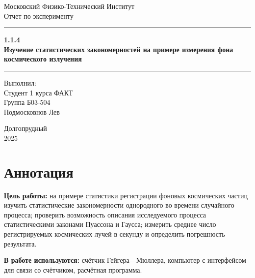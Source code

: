 \documentclass[a4paper, 12pt]{article}
\begin{document}
\begin{titlepage}
    
    \begin{center}
        \vspace*{5cm}
        \Huge Московский Физико-Технический Институт
        \vspace*{2cm}\\
        \LARGE Отчет по эксперименту
        \\\vspace*{0.25cm}
        
        \noindent\rule{\textwidth}{1pt}
        \vspace*{-0.25cm}
        
        \huge \textbf{1.1.4\\ Изучение статистических закономерностей на примере измерения фона космического излучения}
        \noindent\rule{\textwidth}{1pt}


       \vfill
        \begin{flushright}
            \begin{minipage}{.4\textwidth}
            \Large Выполнил:\\ Студент 1 курса ФАКТ\\ Группа Б03-504 \\Подмосковнов Лев\\
            \end{minipage}
        \end{flushright}
        
        \vfill
        \normalsize Долгопрудный \\2025
        
    \end{center}
\end{titlepage}
\restoregeometry

\setcounter{page}{2}
\section*{Аннотация}
\noindent \textbf{Цель работы:} на примере статистики регистрации фоновых космических частиц изучить статистические закономерности однородного во времени случайного процесса; проверить возможность описания исследуемого процесса статистическими законами Пуассона и Гаусса; измерить среднее число регистрируемых космических лучей в секунду и определить погрешность результата.

\noindent \textbf{В работе используются:} счётчик Гейгера—Мюллера, компьютер с интерфейсом для связи со счётчиком, расчётная программа.
\end{document}
